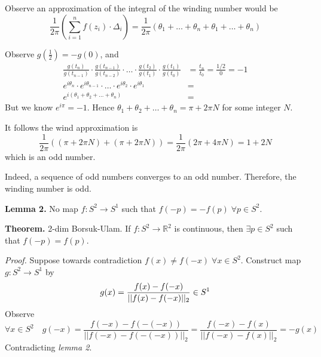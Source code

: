 \documentclass[12pt]{extarticle}
\begin{document}
Observe an approximation of the integral of the winding number would be
$$
\frac{1}{2\pi} \left ( \sum_{i=1}^n f(z_i) \cdot \Delta_i \right ) = \frac{1}{2\pi} (\theta_1 + \dots + \theta_n + \theta_1 + \dots + \theta_n)
$$

Observe $g(\frac{1}{2}) = -g(0)$, and
\begin{align*}
    \frac{g(t_n)}{g(t_{n-1})} \cdot \frac{g(t_{n-1})}{g(t_{n-2})} \cdot \dots \cdot \frac{g(t_2)}{g(t_1)} \cdot \frac{g(t_1)}{g(t_0)} &= \frac{t_n}{t_0} = \frac{1/2}{0} = -1 \\
    e^{i \theta_n} \cdot e^{i \theta_{n-1}} \cdot \dots \cdot e^{i \theta_2} \cdot e^{i \theta_1} &= \\
    e^{i(\theta_1 + \theta_2 + \dots + \theta_n)} &=
\end{align*}
But we know $e^{i \pi} = -1$. Hence $\theta_1 + \theta_2 + \dots + \theta_n = \pi + 2 \pi N$ for some integer $N$.

It follows the wind approximation is
$$
\frac{1}{2 \pi}((\pi + 2 \pi N) + (\pi + 2 \pi N)) = \frac{1}{2 \pi}(2 \pi + 4 \pi N) = 1 + 2N
$$
which is an odd number.

Indeed, a sequence of odd numbers converges to an odd number. Therefore, the winding number is odd.

\textbf{Lemma 2.} No map $f:S^2 \rightarrow S^1$ such that $f(-p) = -f(p) \; \forall p \in S^2$.



\textbf{Theorem.} 2-dim Borsuk-Ulam. If $f: S^2 \rightarrow \mathbb{R}^2$ is continuous, then $\exists p \in S^2$ such that $f(-p) = f(p)$.

\textit{Proof.} Suppose towards contradiction $f(x) \neq f(-x) \; \forall x \in S^2$. Construct map $g: S^2 \rightarrow S^1$ by
$$
    g(x) = \frac{f(x) - f(-x)}{|| f(x) - f(-x) ||_2} \in S^1 \\
$$
Observe 
$$
    \forall x \in S^2 \quad g(-x) = \frac{f(-x) - f(-(-x))}{|| f(-x) - f(-(-x)) ||_2} = \frac{f(-x) - f(x)}{|| f(-x) - f(x) ||_2} = -g(x)
$$
Contradicting \textit{lemma 2}.
\end{document}
